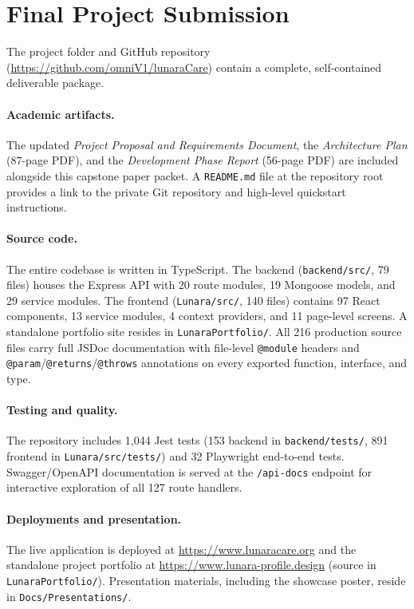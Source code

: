 \documentclass[12pt,letterpaper]{article}
\begin{document}
\newpage

\section{Final Project Submission}

The project folder and GitHub repository (\url{https://github.com/omniV1/lunaraCare}) contain a complete, self-contained deliverable package.

\paragraph{Academic artifacts.}
The updated \emph{Project Proposal and Requirements Document}, the \emph{Architecture Plan} (87-page PDF), and the \emph{Development Phase Report} (56-page PDF) are included alongside this capstone paper packet. A \texttt{README.md} file at the repository root provides a link to the private Git repository and high-level quickstart instructions.

\paragraph{Source code.}
The entire codebase is written in TypeScript. The backend (\texttt{backend/src/}, 79 files) houses the Express API with 20 route modules, 19 Mongoose models, and 29 service modules. The frontend (\texttt{Lunara/src/}, 140 files) contains 97 React components, 13 service modules, 4 context providers, and 11 page-level screens. A standalone portfolio site resides in \texttt{LunaraPortfolio/}. All 216 production source files carry full JSDoc documentation with file-level \texttt{@module} headers and \texttt{@param}/\texttt{@returns}/\texttt{@throws} annotations on every exported function, interface, and type.

\paragraph{Testing and quality.}
The repository includes 1,044 Jest tests (153 backend in \texttt{backend/tests/}, 891 frontend in \texttt{Lunara/src/tests/}) and 32 Playwright end-to-end tests. Swagger/OpenAPI documentation is served at the \texttt{/api-docs} endpoint for interactive exploration of all 127 route handlers.

\paragraph{Deployments and presentation.}
The live application is deployed at \url{https://www.lunaracare.org} and the standalone project portfolio at \url{https://www.lunara-profile.design} (source in \texttt{LunaraPortfolio/}). Presentation materials, including the showcase poster, reside in \texttt{Docs/Presentations/}.
\end{document}
